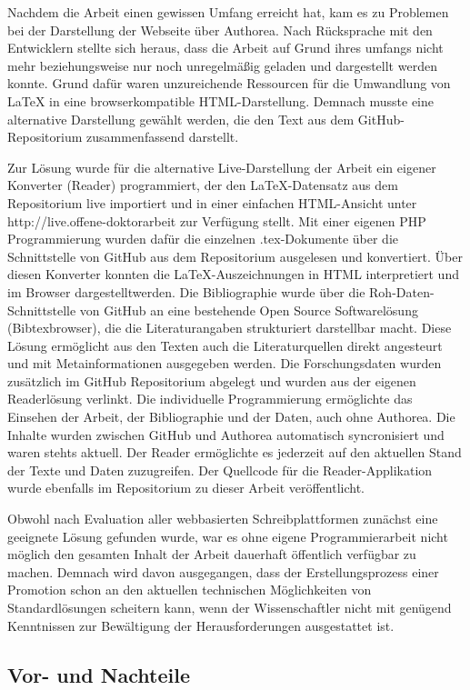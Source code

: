 Nachdem die Arbeit einen gewissen Umfang erreicht hat, kam es zu Problemen bei der Darstellung der Webseite über Authorea. Nach Rücksprache mit den Entwicklern stellte sich heraus, dass die Arbeit auf Grund ihres umfangs nicht mehr beziehungsweise nur noch unregelmäßig geladen und dargestellt werden konnte. Grund dafür waren unzureichende Ressourcen für die Umwandlung von LaTeX in eine browserkompatible HTML-Darstellung. Demnach musste eine alternative Darstellung gewählt werden, die den Text aus dem GitHub-Repositorium zusammenfassend darstellt.

Zur Lösung wurde für die alternative Live-Darstellung der Arbeit ein eigener Konverter (Reader) programmiert, der den LaTeX-Datensatz aus dem Repositorium live importiert und in einer einfachen HTML-Ansicht unter http://live.offene-doktorarbeit zur Verfügung stellt. Mit einer eigenen PHP Programmierung wurden dafür die einzelnen .tex-Dokumente über die Schnittstelle von GitHub aus dem Repositorium ausgelesen und konvertiert. Über diesen Konverter konnten die LaTeX-Auszeichnungen in HTML interpretiert und im Browser dargestelltwerden. Die Bibliographie wurde über die Roh-Daten-Schnittstelle von GitHub an eine bestehende Open Source Softwarelösung (Bibtexbrowser), die die Literaturangaben strukturiert darstellbar macht. Diese Lösung ermöglicht aus den Texten auch die Literaturquellen direkt angesteurt und mit Metainformationen ausgegeben werden. Die Forschungsdaten wurden zusätzlich im GitHub Repositorium abgelegt und wurden aus der eigenen Readerlösung verlinkt. Die individuelle Programmierung ermöglichte das Einsehen der Arbeit, der Bibliographie und der Daten, auch ohne Authorea. Die Inhalte wurden zwischen GitHub und Authorea automatisch syncronisiert und waren stehts aktuell. Der Reader ermöglichte es jederzeit auf den aktuellen Stand der Texte und Daten zuzugreifen. Der Quellcode für die Reader-Applikation wurde ebenfalls im Repositorium zu dieser Arbeit veröffentlicht.

Obwohl nach Evaluation aller webbasierten Schreibplattformen zunächst eine geeignete Lösung gefunden wurde, war es ohne eigene Programmierarbeit nicht möglich den gesamten Inhalt der Arbeit dauerhaft öffentlich verfügbar zu machen. Demnach wird davon ausgegangen, dass der Erstellungsprozess einer Promotion schon an den aktuellen technischen Möglichkeiten von Standardlösungen scheitern kann, wenn der Wissenschaftler nicht mit genügend Kenntnissen zur Bewältigung der Herausforderungen ausgestattet ist.

\subsection{Vor- und Nachteile}


